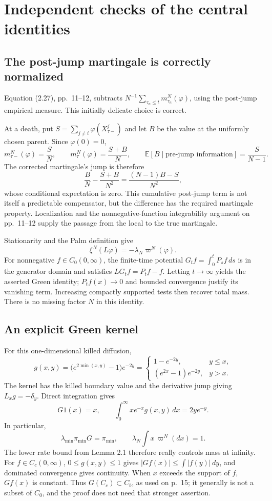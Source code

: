 \documentclass[10pt]{article}
\begin{document}
\section*{Independent checks of the central identities}
\subsection*{The post-jump martingale is correctly normalized}
Equation (2.27), pp. 11–12, subtracts \(N^{-1}\sum_{\tau_n\leq t}m_{\tau_n}^N(\varphi)\), using the post-jump empirical measure. This initially delicate choice is correct.\par
At a death, put \(S=\sum_{j\ne i}\varphi(X^j_{\tau-})\) and let \(B\) be the value at the uniformly chosen parent. Since \(\varphi(0)=0\), \[m_{\tau-}^N(\varphi)=\frac SN,\qquad
 m_\tau^N(\varphi)=\frac{S+B}N,\qquad
 \mathbb E[B\mid\text{pre-jump information}]=\frac S{N-1}.\] The corrected martingale’s jump is therefore \[\frac BN-\frac{S+B}{N^2}
 =\frac{(N-1)B-S}{N^2},\] whose conditional expectation is zero. This cumulative post-jump term is not itself a predictable compensator, but the difference has the required martingale property. Localization and the nonnegative-function integrability argument on pp. 11–12 supply the passage from the local to the true martingale.\par
Stationarity and the Palm definition give \[\xi^N(L\varphi)=-\lambda_N\varpi^N(\varphi).\] For nonnegative \(f\in C_0(0,\infty)\), the finite-time potential \(G_tf=\int_0^tP_sf\,ds\) is in the generator domain and satisfies \(LG_tf=P_tf-f\). Letting \(t\to\infty\) yields the asserted Green identity; \(P_tf(x)\to0\) and bounded convergence justify its vanishing term. Increasing compactly supported tests then recover total mass. There is no missing factor \(N\) in this identity.\par
\subsection*{An explicit Green kernel}
For this one-dimensional killed diffusion, \[g(x,y)=\bigl(e^{2\min(x,y)}-1\bigr)e^{-2y}
 =\begin{cases}
  1-e^{-2y},&y\leq x,\\
  (e^{2x}-1)e^{-2y},&y>x.
 \end{cases}\] The kernel has the killed boundary value and the derivative jump giving \(L_xg=-\delta_y\). Direct integration gives \[G1(x)=x,\qquad
 \int_0^\infty xe^{-x}g(x,y)\,dx=2ye^{-y}.\] In particular, \[\lambda_{\min}\pi_{\min}G=\pi_{\min},\qquad
 \lambda_N\int x\,\varpi^N(dx)=1.\] The lower rate bound from Lemma 2.1 therefore really controls mass at infinity. For \(f\in C_c(0,\infty)\), \(0\leq g(x,y)\leq1\) gives \(|Gf(x)|\leq\int|f(y)|\,dy\), and dominated convergence gives continuity. When \(x\) exceeds the support of \(f\), \(Gf(x)\) is constant. Thus \(G(C_c)\subset C_b\), as used on p. 15; it generally is not a subset of \(C_0\), and the proof does not need that stronger assertion.\par
\end{document}
